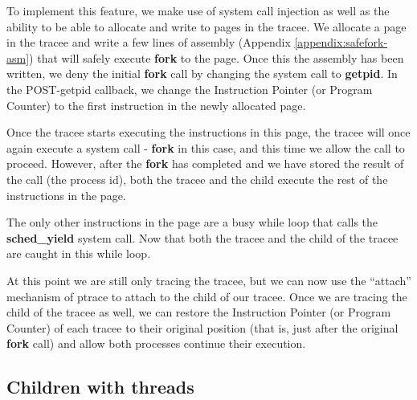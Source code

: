 \documentclass[a4paper, 10pt]{report}
\begin{document}
To implement this feature, we make use of system call injection as well as the
ability to be able to allocate and write to pages in the tracee. We allocate a
page in the tracee and write a few lines of assembly (Appendix
\ref{appendix:safefork-asm}) that will safely execute
\textbf{fork} to the page.
Once this the assembly has been written, we deny the initial
\textbf{fork} call by changing the system call to \textbf{getpid}.
In the POST-getpid callback, we change the Instruction Pointer
(or Program Counter) to the first instruction in the newly allocated page.

Once the tracee starts executing the instructions in this
page, the tracee will once again execute a system call -
\textbf{fork} in this case, and this time we allow the call to proceed.
However, after the \textbf{fork} has completed
and we have stored the result of the call (the process id), both the tracee
and the child execute the rest of the instructions in the page.

The only other instructions in the page are a busy while loop that
calls the \textbf{sched\_yield} system call.
Now that both the tracee and the child of the tracee are caught
in this while loop.

At this point we are still only tracing the tracee, but we can now use the
``attach'' mechanism of ptrace to attach to the child of our tracee. Once we are
tracing the child of the tracee as well, we can restore the Instruction Pointer
(or Program Counter) of each tracee to their original position
(that is, just after the original \textbf{fork} call) and allow both
processes continue their execution.



\subsection{Children with threads}



\end{document}
